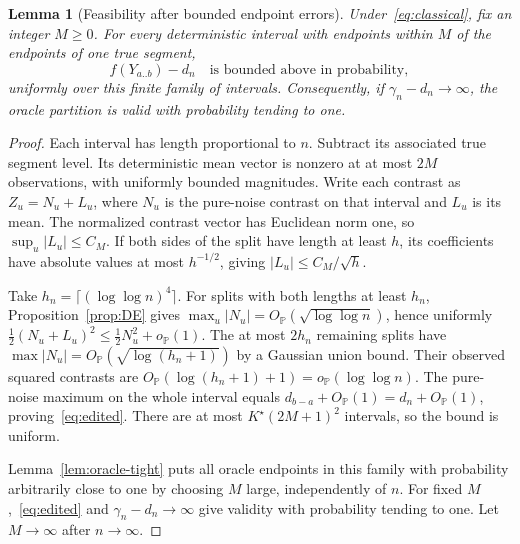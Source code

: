 \documentclass[pdflatex,sn-mathphys-num]{sn-jnl}
\newcommand{\Prob}{\mathbb P}
\newcommand{\op}{o_{\Prob}}
\newcommand{\Op}{O_{\Prob}}
\theoremstyle{thmstyleone}
\newtheorem{lemma}[theorem]{Lemma}
\theoremstyle{thmstyletwo}
\begin{document}
\begin{lemma}[Feasibility after bounded endpoint errors]\label{lem:edited}
Under~\eqref{eq:classical}, fix an integer $M\ge0$. For every deterministic
interval with endpoints within $M$ of the endpoints of one true segment,
\begin{equation}\label{eq:edited}
f(Y_{a..b})-d_n\quad\text{is bounded above in probability},
\end{equation}
uniformly over this finite family of intervals.
Consequently, if $\gamma_n-d_n\to\infty$, the oracle partition is valid
with probability tending to one.
\end{lemma}
\begin{proof}
Each interval has length proportional to $n$. Subtract its associated true
segment level. Its deterministic mean vector is nonzero at at most $2M$
observations, with uniformly bounded magnitudes. Write each contrast as
$Z_u=N_u+L_u$, where $N_u$ is the pure-noise contrast on that interval and
$L_u$ is its mean. The normalized contrast vector has Euclidean norm one,
so $\sup_u|L_u|\le C_M$. If both sides of the split have length at least $h$,
its coefficients have absolute values at most $h^{-1/2}$, giving
$|L_u|\le C_M/\sqrt h$.

Take $h_n=\lceil(\log\log n)^4\rceil$.
For splits with both lengths at least $h_n$, Proposition~\ref{prop:DE} gives
$\max_u|N_u|=\Op(\sqrt{\log\log n})$, hence uniformly
$\tfrac12(N_u+L_u)^2\le\tfrac12N_u^2+\op(1)$.
The at most $2h_n$ remaining splits have
$\max|N_u|=\Op(\sqrt{\log(h_n+1)})$ by a Gaussian union bound.
Their observed squared contrasts are $\Op(\log(h_n+1)+1)=\op(\log\log n)$.
The pure-noise maximum on the whole interval equals
$d_{b-a}+\Op(1)=d_n+\Op(1)$, proving~\eqref{eq:edited}.
There are at most $K^\star(2M+1)^2$ intervals, so the bound is uniform.

Lemma~\ref{lem:oracle-tight} puts all oracle endpoints in this family with
probability arbitrarily close to one by choosing $M$ large, independently
of $n$. For fixed $M$,~\eqref{eq:edited} and $\gamma_n-d_n\to\infty$ give
validity with probability tending to one. Let $M\to\infty$ after $n\to\infty$.
\end{proof}
\end{document}
